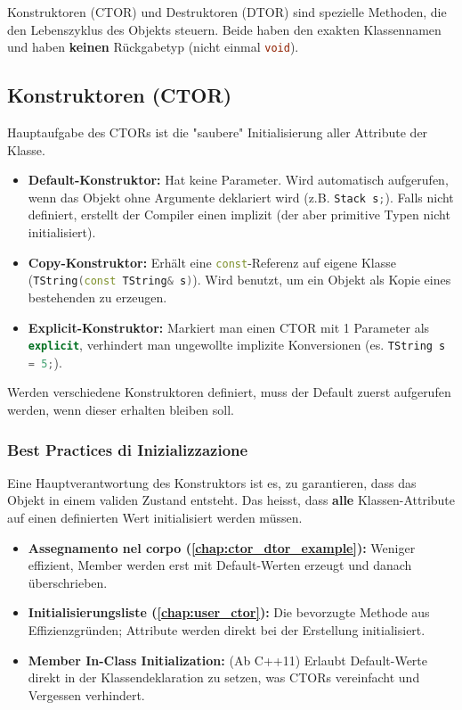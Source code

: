 Konstruktoren (CTOR) und Destruktoren (DTOR) sind spezielle Methoden, die den Lebenszyklus des Objekts steuern. 
Beide haben den exakten Klassennamen und haben \textbf{keinen} Rückgabetyp (nicht einmal \lstinline[language=C++]|void|).

\subsection{Konstruktoren (CTOR)}

Hauptaufgabe des CTORs ist die "saubere" Initialisierung aller Attribute der Klasse.

\begin{itemize}
    \item \textbf{Default-Konstruktor:} Hat keine Parameter. Wird automatisch aufgerufen, wenn das Objekt ohne Argumente deklariert wird (z.B. \lstinline[language=C++]|Stack s;|). 
    Falls nicht definiert, erstellt der Compiler einen implizit (der aber primitive Typen nicht initialisiert).
    \item \textbf{Copy-Konstruktor:} Erhält eine \lstinline[language=C++]|const|-Referenz auf eigene Klasse (\lstinline[language=C++]|TString(const TString& s)|). 
    Wird benutzt, um ein Objekt als Kopie eines bestehenden zu erzeugen.
    \item \textbf{Explicit-Konstruktor:} Markiert man einen CTOR mit 1 Parameter als \lstinline[language=C++]|explicit|, verhindert man ungewollte implizite Konversionen (es. \lstinline[language=C++]|TString s = 5;|).
\end{itemize}

Werden verschiedene Konstruktoren definiert, muss der Default zuerst aufgerufen werden, wenn dieser erhalten bleiben soll.

\subsubsection{Best Practices di Inizializzazione}
Eine Hauptverantwortung des Konstruktors ist es, zu garantieren, dass das Objekt in einem validen Zustand entsteht. 
Das heisst, dass \textbf{alle} Klassen-Attribute auf einen definierten Wert initialisiert werden müssen.

\begin{itemize}
    \item \textbf{Assegnamento nel corpo (\ref{chap:ctor_dtor_example}):} Weniger effizient, Member werden erst mit Default-Werten erzeugt und danach überschrieben.
    \item \textbf{Initialisierungsliste (\ref{chap:user_ctor}):} Die bevorzugte Methode aus Effizienzgründen; Attribute werden direkt bei der Erstellung initialisiert.
    \item \textbf{Member In-Class Initialization:} (Ab C++11) Erlaubt Default-Werte direkt in der Klassendeklaration zu setzen, was CTORs vereinfacht und Vergessen verhindert.
\end{itemize}

